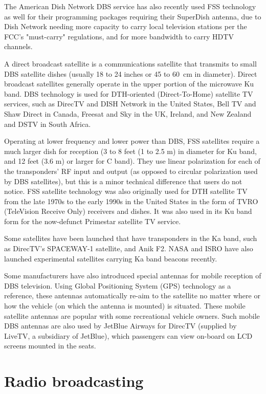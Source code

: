 The American Dish Network DBS service has also recently used FSS
technology as well for their programming packages requiring their
SuperDish antenna, due to Dish Network needing more capacity to carry
local television stations per the FCC's "must-carry" regulations, and
for more bandwidth to carry HDTV channels.

A direct broadcast satellite is a communications satellite that
transmits to small DBS satellite dishes (usually 18 to 24 inches or 45
to 60~cm in diameter). Direct broadcast satellites generally operate in
the upper portion of the microwave Ku band. DBS technology is used for
DTH-oriented (Direct-To-Home) satellite TV services, such as DirecTV and
DISH Network in the United States, Bell TV and Shaw Direct in Canada,
Freesat and Sky in the UK, Ireland, and New Zealand and DSTV in South
Africa.

Operating at lower frequency and lower power than DBS, FSS satellites
require a much larger dish for reception (3 to 8 feet (1 to 2.5 m) in
diameter for Ku band, and 12 feet (3.6 m) or larger for C band). They
use linear polarization for each of the transponders' RF input and
output (as opposed to circular polarization used by DBS satellites), but
this is a minor technical difference that users do not notice. FSS
satellite technology was also originally used for DTH satellite TV from
the late 1970s to the early 1990s in the United States in the form of
TVRO (TeleVision Receive Only) receivers and dishes. It was also used in
its Ku band form for the now-defunct Primestar satellite TV service.

Some satellites have been launched that have transponders in the Ka
band, such as DirecTV's SPACEWAY-1 satellite, and Anik F2. NASA and ISRO
have also launched experimental satellites carrying Ka band beacons
recently.

Some manufacturers have also introduced special antennas for mobile
reception of DBS television. Using Global Positioning System (GPS)
technology as a reference, these antennas automatically re-aim to the
satellite no matter where or how the vehicle (on which the antenna is
mounted) is situated. These mobile satellite antennas are popular with
some recreational vehicle owners. Such mobile DBS antennas are also used
by JetBlue Airways for DirecTV (supplied by LiveTV, a subsidiary of
JetBlue), which passengers can view on-board on LCD screens mounted in
the seats.

\section{Radio broadcasting}\label{radio-broadcasting}

